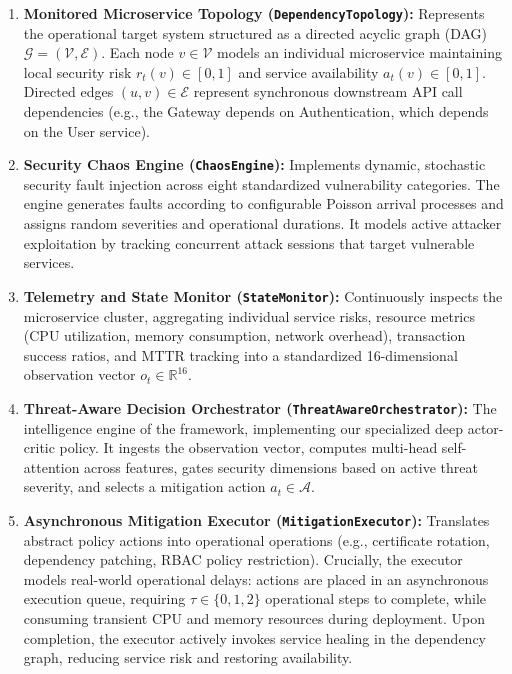 \documentclass[ASNA,twocolumn]{USG}
\begin{document}
\begin{enumerate}
    \item \textbf{Monitored Microservice Topology (\texttt{DependencyTopology}):} Represents the operational target system structured as a directed acyclic graph (DAG) $\mathcal{G} = (\mathcal{V}, \mathcal{E})$. Each node $v \in \mathcal{V}$ models an individual microservice maintaining local security risk $r_t(v) \in [0, 1]$ and service availability $a_t(v) \in [0, 1]$. Directed edges $(u, v) \in \mathcal{E}$ represent synchronous downstream API call dependencies (e.g., the Gateway depends on Authentication, which depends on the User service).
    \item \textbf{Security Chaos Engine (\texttt{ChaosEngine}):} Implements dynamic, stochastic security fault injection across eight standardized vulnerability categories. The engine generates faults according to configurable Poisson arrival processes and assigns random severities and operational durations. It models active attacker exploitation by tracking concurrent attack sessions that target vulnerable services.
    \item \textbf{Telemetry and State Monitor (\texttt{StateMonitor}):} Continuously inspects the microservice cluster, aggregating individual service risks, resource metrics (CPU utilization, memory consumption, network overhead), transaction success ratios, and MTTR tracking into a standardized 16-dimensional observation vector $o_t \in \mathbb{R}^{16}$.
    \item \textbf{Threat-Aware Decision Orchestrator (\texttt{ThreatAwareOrchestrator}):} The intelligence engine of the framework, implementing our specialized deep actor-critic policy. It ingests the observation vector, computes multi-head self-attention across features, gates security dimensions based on active threat severity, and selects a mitigation action $a_t \in \mathcal{A}$.
    \item \textbf{Asynchronous Mitigation Executor (\texttt{MitigationExecutor}):} Translates abstract policy actions into operational operations (e.g., certificate rotation, dependency patching, RBAC policy restriction). Crucially, the executor models real-world operational delays: actions are placed in an asynchronous execution queue, requiring $\tau \in \{0, 1, 2\}$ operational steps to complete, while consuming transient CPU and memory resources during deployment. Upon completion, the executor actively invokes service healing in the dependency graph, reducing service risk and restoring availability.
\end{enumerate}
\end{document}

